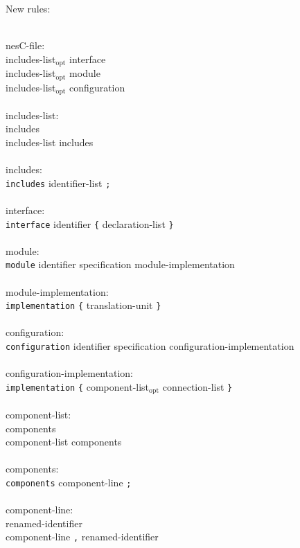 \documentclass[11pt]{article}
\newcommand{\kw}[1]{{\tt #1}}
\newcommand{\opt}{$_{\mbox{opt}}$\xspace}
\begin{document}
New rules:
\em \begin{tabbing}
\hspace*{2cm}\= \\ \kill
nesC-file: \\
\>	includes-list\opt interface\\
\>	includes-list\opt module\\
\>	includes-list\opt configuration\\
\\
includes-list:\\
\>	includes\\
\>	includes-list includes\\
\\
includes:\\
\>	\kw{includes} identifier-list \kw{;}\\
\\
interface:\\
\>	\kw{interface} identifier \kw{\{} declaration-list \kw{\}}\\
\\
module:\\
\>	\kw{module} identifier specification module-implementation\\
\\
module-implementation:\\
\>	\kw{implementation} \kw{\{} translation-unit \kw{\}}\\
\\
configuration:\\
\>	\kw{configuration} identifier specification configuration-implementation\\
\\
configuration-implementation:\\
\>	\kw{implementation} \kw{\{} component-list\opt connection-list \kw{\}}\\
\\
component-list:\\
\>	components\\
\>	component-list components\\
\\
components:\\
\>	\kw{components} component-line \kw{;}\\
\\
component-line:\\
\>	renamed-identifier\\
\>	component-line \kw{,} renamed-identifier\\
\\

\end{tabbing}
\end{document}
